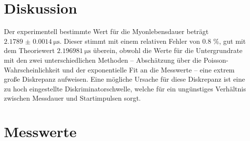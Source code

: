 \section{Diskussion}
Der experimentell bestimmte Wert für die Myonlebensdauer beträgt $\SI[separate-uncertainty=true]{2.1789(14)}{\micro\second}$. Dieser stimmt mit einem relativen Fehler von 0.8 \%, gut mit dem Theoriewert $\SI{2.196981}{\micro\second}$ \cite{PDG} überein, obwohl die Werte für die Untergrundrate mit den zwei unterschiedlichen Methoden -- Abschätzung über die Poisson-Wahrscheinlichkeit und der exponentielle Fit an die Messwerte -- eine extrem große Diskrepanz aufweisen. Eine mögliche Ursache für diese Diskrepanz ist eine zu hoch eingestellte Diskriminatorschwelle, welche für ein ungünstiges Verhältnis zwischen Messdauer und Startimpulsen sorgt.

\printbibliography


\newpage
\section{Messwerte}

